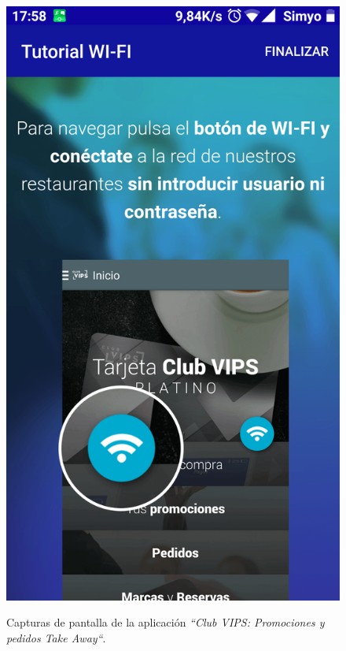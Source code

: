 \documentclass[twoside]{report}
\begin{document}
\begin{figure}[H]
\begin{center}
\includegraphics[scale=0.25]{images/restaurantes/vips2.png}
\caption{Capturas de pantalla de la aplicación \textit{“Club VIPS: Promociones y pedidos Take Away“}.} \cite{vipsapp}
\end{center}
\end{figure}
\end{document}
